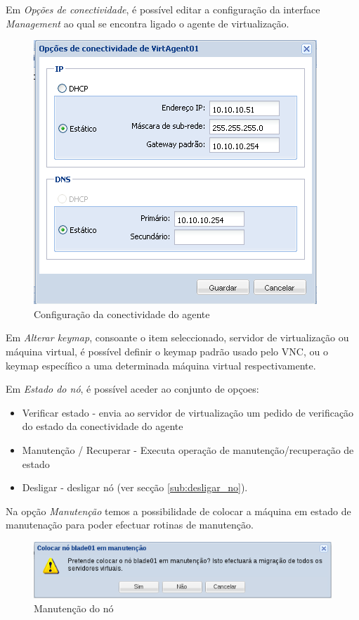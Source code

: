 Em \emph{Opções de conectividade}, é possível editar a configuração da interface \emph{Management} ao qual se encontra ligado o agente de virtualização.
\begin{figure}[H]
	\begin{center}
	\includegraphics[scale=0.5]{screenshots/node_conn.png}
	\caption{Configuração da conectividade do agente}
	\label{fig:node_conn}
	\end{center}
\end{figure}

Em \emph{Alterar keymap}, consoante o item seleccionado, servidor de virtualização ou máquina virtual, é possível definir o keymap padrão usado pelo VNC, ou o keymap específico a uma determinada máquina virtual respectivamente.

Em \emph{Estado do nó}, é possível aceder ao conjunto de opçoes:
\begin{itemize}
    \item Verificar estado - envia ao servidor de virtualização um pedido de verificação do estado da conectividade do agente
    \item Manutenção / Recuperar - Executa operação de manutenção/recuperação de estado 
    \item Desligar - desligar nó (ver secção \ref{sub:desligar_no}).
\end{itemize}

Na opção \emph{Manutenção} temos a possibilidade de colocar a máquina em estado de manutenação para poder efectuar rotinas de manutenção.
\begin{figure}[H]
	\begin{center}
	\includegraphics[scale=0.45]{screenshots/node_maintenance.png}
	\caption{Manutenção do nó}
	\label{fig:node_maintenance}
	\end{center}
\end{figure}


